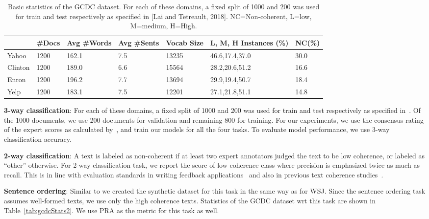 \documentclass[11pt]{article}
\begin{document}
\begin{table}
    \centering
    \scriptsize
    \begin{tabular}{|l|l|p{0.3in}|p{0.3in}|p{0.3in}|p{0.6in}|l|}
\hline
&\#Docs&Avg \#Words&Avg \#Sents&Vocab Size&L, M, H Instances (\%)&NC(\%)\\
\hline
Yahoo&1200&162.1&7.5&13235&46.6,17.4,37.0&30.0\\
\hline
Clinton&1200&189.0&6.6&15564&28.2,20.6,51.2&16.6\\
\hline
Enron&1200&196.2&7.7&13694&29.9,19.4,50.7&18.4\\
\hline
Yelp&1200&183.1&7.5&12201&27.1,21.8,51.1&14.8\\
\hline
    \end{tabular}
    \caption{Basic statistics of the GCDC dataset. For each of these domains, a fixed split of 1000 and 200 was used for train and test respectively as specified in [Lai and Tetreault, 2018]. NC=Non-coherent, L=low, M=medium, H=High.}
    \label{tab:gcdcStats}
\end{table}

\noindent\textbf{3-way classification}: For each of these domains, a fixed split of 1000 and 200 was used for train and test respectively as specified in~\cite{lai2018discourse}. Of the 1000 documents, we use 200 documents for validation and remaining 800 for training. For our experiments, we use the consensus rating of the expert scores as calculated by~\cite{lai2018discourse}, and train our models for all the four tasks. To evaluate model performance, we use 3-way classification accuracy.

\noindent\textbf{2-way classification}: A text is labeled as non-coherent if at least two expert annotators judged the text to be low coherence, or labeled as ``other'' otherwise. For 2-way classification task, we report the  score of low coherence class where precision is emphasized twice as much as recall. This is in line with evaluation standards in writing feedback applications~\cite{ng2014conll} and also in previous text coherence studies~\cite{lai2018discourse}.

\noindent\textbf{Sentence ordering}: Similar to \cite{lai2018discourse} we created the synthetic dataset for this task in the same way as for WSJ. Since the sentence ordering task assumes well-formed texts, we use
only the high coherence texts. Statistics of the GCDC dataset wrt this task are shown in Table~\ref{tab:gcdcStats2}. We use PRA as the metric for this task as well.
\end{document}
